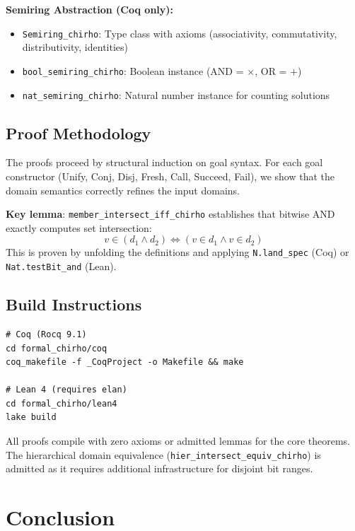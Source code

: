 \documentclass[11pt,a4paper]{article}
\begin{document}
\textbf{Semiring Abstraction (Coq only):}
\begin{itemize}
  \item \texttt{Semiring\_chirho}: Type class with axioms (associativity, commutativity, distributivity, identities)
  \item \texttt{bool\_semiring\_chirho}: Boolean instance (AND = $\times$, OR = $+$)
  \item \texttt{nat\_semiring\_chirho}: Natural number instance for counting solutions
\end{itemize}

\subsection{Proof Methodology}

The proofs proceed by structural induction on goal syntax.
For each goal constructor (Unify, Conj, Disj, Fresh, Call, Succeed, Fail), we show that the domain semantics correctly refines the input domains.

\textbf{Key lemma}: \texttt{member\_intersect\_iff\_chirho} establishes that bitwise AND exactly computes set intersection:
\[
v \in (d_1 \land d_2) \Leftrightarrow (v \in d_1 \wedge v \in d_2)
\]
This is proven by unfolding the definitions and applying \texttt{N.land\_spec} (Coq) or \texttt{Nat.testBit\_and} (Lean).

\subsection{Build Instructions}

\begin{verbatim}
# Coq (Rocq 9.1)
cd formal_chirho/coq
coq_makefile -f _CoqProject -o Makefile && make

# Lean 4 (requires elan)
cd formal_chirho/lean4
lake build
\end{verbatim}

All proofs compile with zero axioms or admitted lemmas for the core theorems.
The hierarchical domain equivalence (\texttt{hier\_intersect\_equiv\_chirho}) is admitted as it requires additional infrastructure for disjoint bit ranges.

\section{Conclusion}
\end{document}
